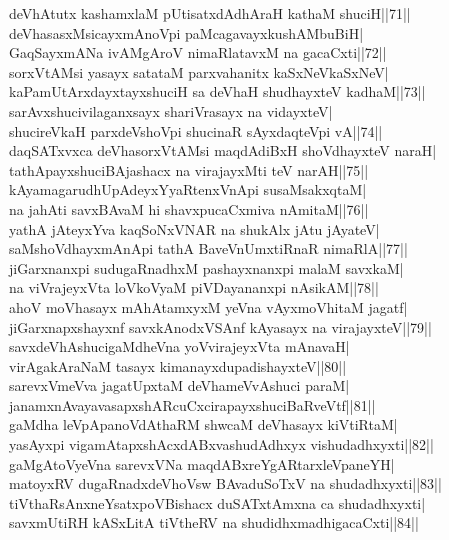 \documentclass{article}
\begin{document}
deVhAtutx kashamxlaM pUtisatxdAdhAraH kathaM shuciH||71||\\
deVhasasxMsicayxmAnoVpi paMcagavayxkushAMbuBiH|\\
GaqSayxmANa ivAMgAroV nimaRlatavxM na gacaCxti||72||\\
sorxVtAMsi yasayx satataM parxvahanitx kaSxNeVkaSxNeV|\\
kaPamUtArxdayxtayxshuciH sa deVhaH shudhayxteV kadhaM||73||\\
sarAvxshucivilaganxsayx shariVrasayx na vidayxteV|\\
shucireVkaH parxdeVshoVpi shucinaR sAyxdaqteVpi vA||74||\\
daqSATxvxca deVhasorxVtAMsi maqdAdiBxH shoVdhayxteV naraH|\\
tathApayxshuciBAjashacx na virajayxMti teV narAH||75||\\
kAyamagarudhUpAdeyxYyaRtenxVnApi susaMsakxqtaM|\\
na jahAti savxBAvaM hi shavxpucaCxmiva nAmitaM||76||\\
yathA jAteyxYva kaqSoNxVNAR na shukAlx jAtu jAyateV|\\
saMshoVdhayxmAnApi tathA BaveVnUmxtiRnaR nimaRlA||77||\\
jiGarxnanxpi sudugaRnadhxM pashayxnanxpi malaM savxkaM|\\
na viVrajeyxVta loVkoVyaM piVDayananxpi nAsikAM||78||\\
ahoV moVhasayx mAhAtamxyxM yeVna vAyxmoVhitaM jagatf|\\
jiGarxnapxshayxnf savxkAnodxVSAnf kAyasayx na virajayxteV||79||\\
savxdeVhAshucigaMdheVna yoVvirajeyxVta mAnavaH|\\
virAgakAraNaM tasayx kimanayxdupadishayxteV||80||\\
sarevxVmeVva jagatUpxtaM deVhameVvAshuci paraM|\\
janamxnAvayavasapxshARcuCxcirapayxshuciBaRveVtf||81||\\
gaMdha leVpApanoVdAthaRM shwcaM deVhasayx kiVtiRtaM|\\
yasAyxpi vigamAtapxshAcxdABxvashudAdhxyx vishudadhxyxti||82||\\
gaMgAtoVyeVna sarevxVNa maqdABxreYgARtarxleVpaneYH|\\
matoyxRV dugaRnadxdeVhoVsw BAvaduSoTxV na shudadhxyxti||83||\\
tiVthaRsAnxneYsatxpoVBishacx duSATxtAmxna ca shudadhxyxti|\\
savxmUtiRH kASxLitA tiVtheRV na shudidhxmadhigacaCxti||84||\\
\end{document}
